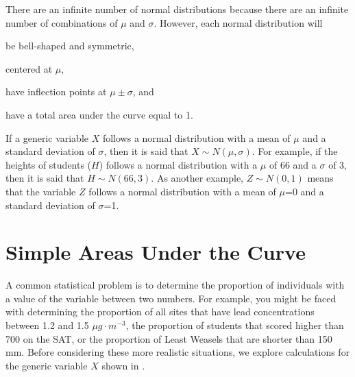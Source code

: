 \documentclass[10pt,openany]{book}\usepackage[]{graphicx}\usepackage[]{color}
\begin{document}

\begin{minipage}{\textwidth}
There are an infinite number of normal distributions because there are an infinite number of combinations of $\mu$ and $\sigma$.  However, each normal distribution will
\begin{Enumerate}
  \item be bell-shaped and symmetric,
  \item centered at $\mu$,
  \item have inflection points at $\mu \pm \sigma$, and
  \item have a total area under the curve equal to 1.
\end{Enumerate}
\end{minipage}


If a generic variable $X$ follows a normal distribution with a mean of $\mu$ and a standard deviation of $\sigma$, then it is said that $X\sim N(\mu,\sigma)$.  For example, if the heights of students ($H$) follows a normal distribution with a $\mu$ of 66 and a $\sigma$ of 3, then it is said that $H\sim N(66,3)$.  As another example, $Z\sim N(0,1)$ means that the variable $Z$ follows a normal distribution with a mean of $\mu$=0 and a standard deviation of $\sigma$=1.




\section{Simple Areas Under the Curve}
\vspace{-8pt}
A common statistical problem is to determine the proportion of individuals with a value of the variable between two numbers.  For example, you might be faced with determining the proportion of all sites that have lead concentrations between 1.2 and 1.5 $\mu g \cdot m^{-3}$, the proportion of students that scored higher than 700 on the SAT, or the proportion of Least Weasels that are shorter than 150 mm.  Before considering these more realistic situations, we explore calculations for the generic variable $X$ shown in .
\end{document}
